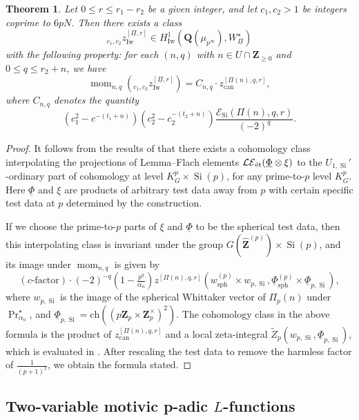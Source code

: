 \documentclass[cjm]{ipart}
\theoremstyle{plain}
\newtheorem{theorem}{Theorem}[subsection]
\theoremstyle{remark}
\DeclareMathOperator{\Iw}{Iw}
\DeclareMathOperator{\mom}{mom}
\DeclareMathOperator{\Sieg}{Si}
\DeclareMathOperator{\sph}{sph}
\newcommand{\QQ}{\mathbf{Q}}
\newcommand{\ZZ}{\mathbf{Z}}
\newcommand{\Zp}{\mathbf{Z}_p}
\newcommand{\cE}{\mathcal{E}}
\newcommand{\can}{\mathrm{can}}
\newcommand{\ch}{\mathrm{ch}}
\newcommand{\et}{\text{\textup{\'et}}}
\newcommand{\uPhi}{\underline{\Phi}}
\newcommand{\uPi}{\underline{\Pi}}
\numberwithin{equation}{subsection}
\renewcommand{\le}{\leqslant}
\renewcommand{\ge}{\geqslant}
\begin{document}
  \begin{theorem}
   \label{thm:Iweltinterp}
   Let $0 \le r \le r_1 - r_2$ be a given integer, and let $c_1, c_2 > 1$ be integers coprime to $6pN$. Then there exists a class
   \[ {}_{c_1, c_2} z^{[\uPi, r]}_{\Iw} \in H^1_{\Iw}(\QQ(\mu_{p^\infty}), W_{\uPi}^{\star}) \]
   with the following property: for each $(n, q)$ with $n \in U \cap \ZZ_{\ge 0}$ and $0 \le q \le r_2 + n$, we have
   \[  \mom_{n, q}\left( {}_{c_1, c_2} z^{[\uPi, r]}_{\Iw}\right) = C_{n, q} \cdot z^{[\Pi(n), q, r]}_{\can}, \]
   where $C_{n, q}$ denotes the quantity
   \[ \left(c_1^2 - c^{-(t_1+n)}\right)\left(c_2^2 - c_2^{-(t_2 + n)}\right) \frac{\cE_{\Sieg}(\Pi(n), q, r)}{(-2)^{q}} .\]
  \end{theorem}

  \begin{proof}
   It follows from the results of \cite{LSZ17} that there exists a cohomology class interpolating the projections of Lemma--Flach elements $\mathcal{LE}_{\et}(\uPhi \otimes \xi)$ to the $U_{1, \Sieg}'$-ordinary part of cohomology at level $K_G^p \times\Sieg(p)$, for any prime-to-$p$ level $K_G^p$. Here $\uPhi$ and $\xi$ are products of arbitrary test data away from $p$ with certain specific test data at $p$ determined by the construction.

   If we choose the prime-to-$p$ parts of $\xi$ and $\uPhi$ to be the spherical test data, then this interpolating class is invariant under the group $G(\widehat{\ZZ}^{(p)}) \times \Sieg(p)$, and its image under $\mom_{n, q}$ is given by
   \[ (\text{$c$-factor}) \cdot (-2)^{-q}\left(1 - \tfrac{p^q}{\alpha_n}\right) z^{[\Pi(n), q, r]}\left(w_{\sph}^{(p)} \times w_{p, \Sieg}, \uPhi_{\sph}^{(p)}\times \uPhi_{p, \Sieg}\right), \]
   where $w_{p, \Sieg}$ is the image of the spherical Whittaker vector of $\Pi_p(n)$ under $\Pr_{\alpha_n}^{\star}$, and $\uPhi_{p, \Sieg} = \ch( (p\Zp \times \Zp^\times)^2)$. The cohomology class in the above formula is the product of $z^{[\Pi(n), q, r]}_{\can}$ and a local zeta-integral $\widetilde{Z}_p\left(w_{p, \Sieg}, \uPhi_{p, \Sieg}\right)$, which is evaluated in \cite[Prop. 4.3.2]{LZ-equivar}. After rescaling the test data to remove the harmless factor of $\frac{1}{(p+1)^2}$, we obtain the formula stated.
  \end{proof}

 \subsection{Two-variable motivic p-adic $L$-functions}
\end{document}
